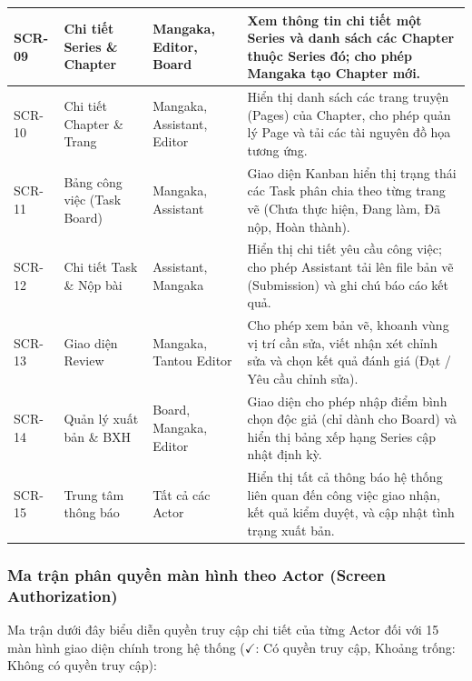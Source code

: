 \begin{longtable}{|p{1.5cm}|p{3.5cm}|p{3.0cm}|p{6.5cm}|}
    SCR-09 & Chi tiết Series \& Chapter & Mangaka, Editor, Board & Xem thông tin chi tiết một Series và danh sách các Chapter thuộc Series đó; cho phép Mangaka tạo Chapter mới. \\ \hline
    SCR-10 & Chi tiết Chapter \& Trang & Mangaka, Assistant, Editor & Hiển thị danh sách các trang truyện (Pages) của Chapter, cho phép quản lý Page và tải các tài nguyên đồ họa tương ứng. \\ \hline
    SCR-11 & Bảng công việc (Task Board) & Mangaka, Assistant & Giao diện Kanban hiển thị trạng thái các Task phân chia theo từng trang vẽ (Chưa thực hiện, Đang làm, Đã nộp, Hoàn thành). \\ \hline
    SCR-12 & Chi tiết Task \& Nộp bài & Assistant, Mangaka & Hiển thị chi tiết yêu cầu công việc; cho phép Assistant tải lên file bản vẽ (Submission) và ghi chú báo cáo kết quả. \\ \hline
    SCR-13 & Giao diện Review & Mangaka, Tantou Editor & Cho phép xem bản vẽ, khoanh vùng vị trí cần sửa, viết nhận xét chỉnh sửa và chọn kết quả đánh giá (Đạt / Yêu cầu chỉnh sửa). \\ \hline
    SCR-14 & Quản lý xuất bản \& BXH & Board, Mangaka, Editor & Giao diện cho phép nhập điểm bình chọn độc giả (chỉ dành cho Board) và hiển thị bảng xếp hạng Series cập nhật định kỳ. \\ \hline
    SCR-15 & Trung tâm thông báo & Tất cả các Actor & Hiển thị tất cả thông báo hệ thống liên quan đến công việc giao nhận, kết quả kiểm duyệt, và cập nhật tình trạng xuất bản. \\ \hline
\end{longtable}

\subsubsection{Ma trận phân quyền màn hình theo Actor (Screen Authorization)}
Ma trận dưới đây biểu diễn quyền truy cập chi tiết của từng Actor đối với 15 màn hình giao diện chính trong hệ thống ($\checkmark$: Có quyền truy cập, Khoảng trống: Không có quyền truy cập):

